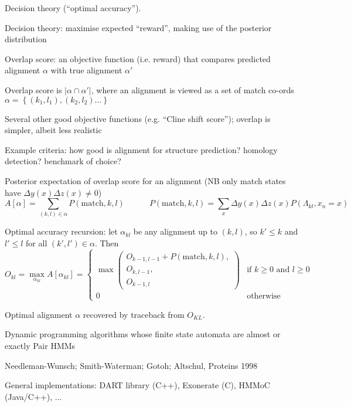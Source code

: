 \documentclass{beamer}
\begin{document}
\begin{frame}{}

Decision theory (``optimal accuracy'').
 \itemb
 \item Decision theory: maximise expected ``reward'', making use of the posterior distribution
 \item Overlap score: an objective function (i.e. reward) that compares predicted alignment $\alpha$ with true alignment $\alpha'$
  \itemb
  \item Overlap score is $|\alpha \cap \alpha'|$, where an alignment is viewed as a set of match co-ords $\alpha = \left\{ (k_1,l_1), (k_2,l_2) \ldots \right\}$
  \item Several other good objective functions (e.g. ``Cline shift score''); overlap is simpler, albeit less realistic
  \item Example criteria: how good is alignment for structure prediction? homology detection? benchmark of choice?
  \iteme
 \item Posterior expectation of overlap score for an alignment (NB only match states have $\Delta y(x) \Delta z(x) \neq 0$)
\[
A[\alpha] = \sum_{(k,l) \in \alpha} P(\mbox{match},k,l) \quad\quad\quad
P(\mbox{match},k,l) = \sum_x \Delta y(x) \Delta z(x) P(\Lambda_{kl},x_n=x)
\]
 \item Optimal accuracy recursion: let $\alpha_{kl}$ be any alignment up to $(k,l)$, so $k' \leq k$ and $l' \leq l$ for all $(k',l') \in \alpha$. Then
\[
O_{kl} = \max_{\alpha_{kl}} A \left[ \alpha_{kl} \right] = \left\{ \begin{array}{ll}
\max \left( \begin{array}{l} O_{k-1,l-1} + P(\mbox{match},k,l), \\ O_{k,l-1}, \\ O_{k-1,l} \end{array} \right) & \mbox{if $k \geq 0$ and $l \geq 0$} \\
0 & \mbox{otherwise}
\end{array} \right.
\]
 \item Optimal alignment $\alpha$ recovered by traceback from $O_{KL}$.
 \iteme

\end{frame}

\begin{frame}{}

\itemb
\item Dynamic programming algorithms whose finite state automata are almost or exactly Pair HMMs
 \itemb
 \item Needleman-Wunsch; Smith-Waterman; Gotoh; Altschul, Proteins 1998
 \item General implementations: DART library (C++), Exonerate (C), HMMoC (Java/C++), ...
 \iteme
\iteme

\end{frame}
\end{document}

